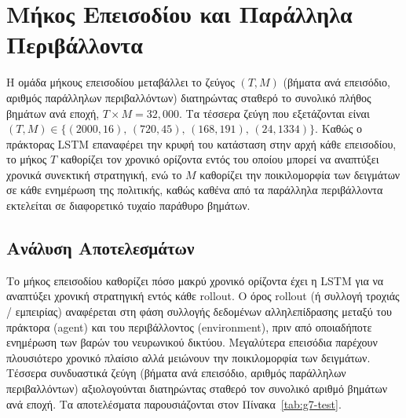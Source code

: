 \section{Μήκος Επεισοδίου και Παράλληλα Περιβάλλοντα}
\label{sec:exp-episodes}

Η ομάδα μήκους επεισοδίου μεταβάλλει το ζεύγος $(T, M)$ (βήματα ανά επεισόδιο, αριθμός παράλληλων
περιβαλλόντων) διατηρώντας σταθερό το συνολικό πλήθος βημάτων ανά εποχή,
$T \times M = 32{,}000$. Τα τέσσερα ζεύγη που εξετάζονται είναι
$(T, M) \in \{(2000, 16),\,(720, 45),\,(168, 191),\,(24, 1334)\}$. Καθώς ο πράκτορας LSTM
επαναφέρει την κρυφή του κατάσταση στην αρχή κάθε επεισοδίου, το μήκος $T$ καθορίζει τον
χρονικό ορίζοντα εντός του οποίου μπορεί να αναπτύξει χρονικά συνεκτική στρατηγική, ενώ το $M$
καθορίζει την ποικιλομορφία των δειγμάτων σε κάθε ενημέρωση της πολιτικής, καθώς καθένα από τα παράλληλα 
περιβάλλοντα εκτελείται σε διαφορετικό τυχαίο παράθυρο βημάτων.

\subsection{Ανάλυση Αποτελεσμάτων}
\label{subsec:exp-episodes-results}

Το μήκος επεισοδίου καθορίζει πόσο μακρύ χρονικό ορίζοντα έχει η LSTM για να αναπτύξει χρονική στρατηγική εντός κάθε rollout. 
O όρος rollout (ή συλλογή τροχιάς / εμπειρίας) αναφέρεται στη φάση συλλογής δεδομένων αλληλεπίδρασης μεταξύ του πράκτορα 
(agent) και του περιβάλλοντος (environment), πριν από οποιαδήποτε ενημέρωση των βαρών του νευρωνικού δικτύου.
Μεγαλύτερα επεισόδια παρέχουν πλουσιότερο χρονικό πλαίσιο αλλά μειώνουν την ποικιλομορφία των δειγμάτων. Τέσσερα συνδυαστικά ζεύγη 
(βήματα ανά επεισόδιο, αριθμός παράλληλων περιβαλλόντων) αξιολογούνται διατηρώντας σταθερό τον συνολικό αριθμό βημάτων ανά εποχή. 
Τα αποτελέσματα παρουσιάζονται στον Πίνακα~\ref{tab:g7-test}.

